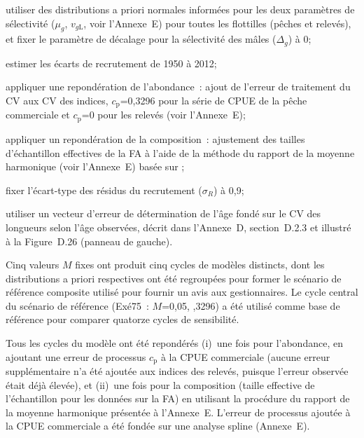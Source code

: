 \documentclass[11pt]{book}
\newcommand{\AppBio}{Annexe~D}
\newcommand{\AppEqn}{Annexe~E}
\begin{document}
\begin{itemize_csas}{}{}
  \item utiliser des distributions a priori normales inform\'{e}es pour les deux param\`{e}tres de s\'{e}lectivit\'{e} ($\mu_g$, $v_{g\text{L}}$, voir l'\AppEqn) pour toutes les flottilles (p\^{e}ches et relev\'{e}s), et fixer le param\`{e}tre de d\'{e}calage pour la s\'{e}lectivit\'{e} des m\^{a}les ($\Delta_{g}$) \`{a} 0;
  \item estimer les \'{e}carts de recrutement de 1950 \`{a} 2012;
  \item appliquer une repond\'{e}ration de l'abondance~: ajout de l'erreur de traitement du CV aux CV des indices, $c_\text{p}$=0,3296 pour la s\'{e}rie de CPUE de la p\^{e}che commerciale et $c_\text{p}$=0 pour les relev\'{e}s (voir l'\AppEqn);
  \item appliquer un repond\'{e}ration de la composition~: ajustement des tailles d'\'{e}chantillon effectives de la FA \`{a} l'aide de la m\'{e}thode du rapport de la moyenne harmonique (voir l'\AppEqn) bas\'{e}e sur \citet{McAllister-Ianelli:1997};
  \item fixer l'\'{e}cart-type des r\'{e}sidus du recrutement ($\sigma_R$) \`{a} 0,9;
  \item utiliser un vecteur d'erreur de d\'{e}termination de l'\^{a}ge fond\'{e} sur le CV des longueurs selon l'\^{a}ge observ\'{e}es, d\'{e}crit dans l'\AppBio, section~D.2.3 et illustr\'{e} \`{a} la Figure~D.26 (panneau de gauche).
\end{itemize_csas}
Cinq valeurs $M$ fixes ont produit cinq cycles de mod\`{e}les distincts, dont les distributions a priori respectives ont \'{e}t\'{e} regroup\'{e}es pour former le sc\'{e}nario de r\'{e}f\'{e}rence composite utilis\'{e} pour fournir un avis aux gestionnaires. Le cycle central du sc\'{e}nario de r\'{e}f\'{e}rence (Ex\'{e}75~: $M$=0,05, ,3296) a \'{e}t\'{e} utilis\'{e} comme base de r\'{e}f\'{e}rence pour comparer quatorze cycles de sensibilit\'{e}.

Tous les cycles du mod\`{e}le ont \'{e}t\'{e} repond\'{e}r\'{e}s (i)~une fois pour l'abondance, en ajoutant une erreur de processus $c_\text{p}$ \`{a} la CPUE commerciale (aucune erreur suppl\'{e}mentaire n'a \'{e}t\'{e} ajout\'{e}e aux indices des relev\'{e}s, puisque l'erreur observ\'{e}e \'{e}tait d\'{e}j\`{a} \'{e}lev\'{e}e), et (ii)~une fois pour la composition (taille effective de l'\'{e}chantillon pour les donn\'{e}es sur la FA) en utilisant la proc\'{e}dure du rapport de la moyenne harmonique pr\'{e}sent\'{e}e \`{a} l'\AppEqn.
L'erreur de processus ajout\'{e}e \`{a} la CPUE commerciale a \'{e}t\'{e} fond\'{e}e sur une analyse spline (\AppEqn).
\end{document}
